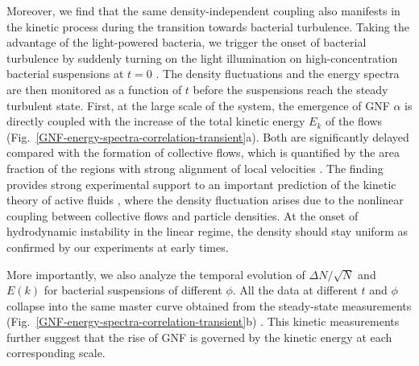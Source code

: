 \documentclass[twocolumn,aps,prl,amsmath,amssymb,longbibliography]{revtex4-2}
\begin{document}
Moreover, %
we find that the same density-independent coupling also manifests in the kinetic process during the transition towards bacterial turbulence. Taking the advantage of the light-powered bacteria, we trigger the onset of bacterial turbulence by suddenly turning on the light illumination on high-concentration bacterial suspensions at $t=0$ \cite{Peng2020}. The density fluctuations and the energy spectra are then monitored as a function of $t$ before the suspensions reach the steady turbulent state. First, at the large scale of the system, the emergence of GNF $\alpha$ is directly coupled with the increase of the total kinetic energy $E_k$ of the flows (Fig.~\ref{GNF-energy-spectra-correlation-transient}a). Both are significantly delayed compared with the formation of collective flows, which is quantified by the area fraction of the regions with strong alignment of local velocities \cite{Liu2020, Peng2020}.
The finding provides strong experimental support to an important prediction of the kinetic theory of active fluids \cite{Saintillan2008a,Saintillan2008b}, where the density fluctuation arises due to the nonlinear coupling between collective flows and particle densities. At the onset of hydrodynamic instability in the linear regime, the density should stay uniform as confirmed by our experiments at early times.

More importantly, we also analyze the temporal evolution of $\Delta N/\sqrt N$ and $E(k)$ for bacterial suspensions of different $\phi$. All the data at different $t$ and $\phi$ collapse into the same master curve obtained from the steady-state measurements (Fig.~\ref{GNF-energy-spectra-correlation-transient}b) \cite{Liu2020}.
This kinetic measurements further suggest that the rise of GNF is governed by the kinetic energy at each corresponding scale.
\end{document}
